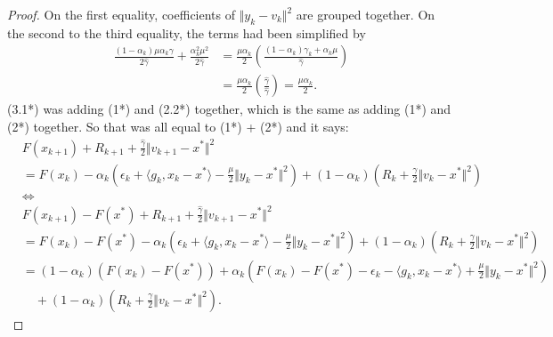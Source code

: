 \documentclass[12pt]{article}
\begin{document}
\begin{proof}
        On the first equality, coefficients of $\Vert y_k - v_k\Vert^2$ are grouped together. 
        On the second to the third equality, the terms had been simplified by 
        \begin{align*}
            \frac{(1 - \alpha_k)\mu\alpha_k\gamma}{2\hat \gamma} + 
            \frac{\alpha_k^2 \mu^2}{2\hat \gamma}
            &= 
            \frac{\mu\alpha_k}{2}\left(
                \frac{(1 - \alpha_k)\gamma_k + \alpha_k \mu}{\hat \gamma}
            \right)
            \\
            &= \frac{\mu\alpha_k}{2}\left(
                \frac{\hat \gamma}{\hat \gamma}
            \right) = \frac{\mu\alpha_k}{2}. 
        \end{align*}
        (3.1*) was adding (1*) and (2.2*) together, which is the same as adding (1*) and (2*) together. 
        So that was all equal to (1*) + (2*) and it says: 
        \begin{align*}
            & F(x_{k + 1}) + R_{k + 1} + 
            \frac{\hat \gamma}{2}\Vert v_{k + 1} - x^*\Vert^2
            \\
            &= 
            F(x_k) - \alpha_k\left(
                \epsilon_k + \langle g_k, x_k - x^*\rangle
                - \frac{\mu}{2}\Vert y_k - x^*\Vert^2
            \right)
            + 
            (1 - \alpha_k)\left(
                R_k + \frac{\gamma}{2}\Vert v_k - x^*\Vert^2
            \right)
            \\
            & \iff 
            \\
            & F(x_{k + 1}) - F(x^*) + R_{k + 1} + 
            \frac{\hat \gamma}{2}\Vert v_{k + 1} - x^*\Vert^2
            \\
            &= 
            F(x_k) - F(x^*) - \alpha_k\left(
                \epsilon_k + \langle g_k, x_k - x^*\rangle
                - \frac{\mu}{2}\Vert y_k - x^*\Vert^2
            \right)
            + 
            (1 - \alpha_k)\left(
                R_k + \frac{\gamma}{2}\Vert v_k - x^*\Vert^2
            \right)
            \\
            &= (1 - \alpha_k)(F(x_k) - F(x^*))
            + \alpha_k\left(
                F(x_k) - F(x^*) - \epsilon_k - \langle g_k, x_k - x^*\rangle + \frac{\mu}{2}\Vert y_k - x^*\Vert^2
            \right)
            \\ &\quad 
                + 
                (1 - \alpha_k)\left(
                    R_k + \frac{\gamma}{2}\Vert v_k - x^*\Vert^2
                \right). 
        \tag{3.2*}
        \end{align*}

\end{proof}
\end{document}
